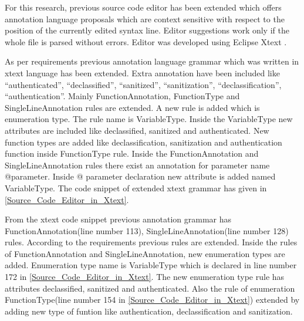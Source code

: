 For this research, previous source code editor \cite{ref_108_paul2015infoflow} has been extended which offers annotation language proposals which are context sensitive with respect to the position of the currently edited syntax line. Editor suggestions work only if the whole file is parsed without errors. Editor was developed using Eclipse Xtext \cite{ref_17_xtext:grammar}.

As per requirements previous annotation language grammar \cite{ref_108_paul2015infoflow} which was written in xtext language has been extended. Extra annotation have been included like \enquote{authenticated}, \enquote{declassified}, \enquote{sanitized}, \enquote{sanitization}, \enquote{declassification}, \enquote{authentication}. Mainly FunctionAnnotation, FunctionType  and SingleLineAnnotation rules  are extended. A new rule is added which is enumeration type. The rule name is VariableType. Inside the VariableType new attributes are included like declassified, sanitized and authenticated. New function types are added like declassification, sanitization and authentication function inside FunctionType rule. Inside the FunctionAnnotation and SingleLineAnnotation rules there exist an annotation for parameter name @parameter. Inside @ parameter declaration new attribute is added named VariableType. The code snippet of extended xtext grammar has given in \ref{Source_Code_Editor_in_Xtext}. 


From the xtext code snippet previous annotation grammar \cite{ref_108_paul2015infoflow} has FunctionAnnotation(line number 113), SingleLineAnnotation(line number 128) rules. According to the requirements previous rules are extended. Inside the rules of FunctionAnnotation and SingleLineAnnotation, new enumeration types are added. Enumeration type name is VariableType which is declared in line number 172 in \ref{Source_Code_Editor_in_Xtext}. The new enumeration type rule has attributes declassified, sanitized and authenticated. Also the rule of enumeration FunctionType(line number 154 in \ref{Source_Code_Editor_in_Xtext}) extended by adding new type of funtion like authentication, declassification and sanitization.

